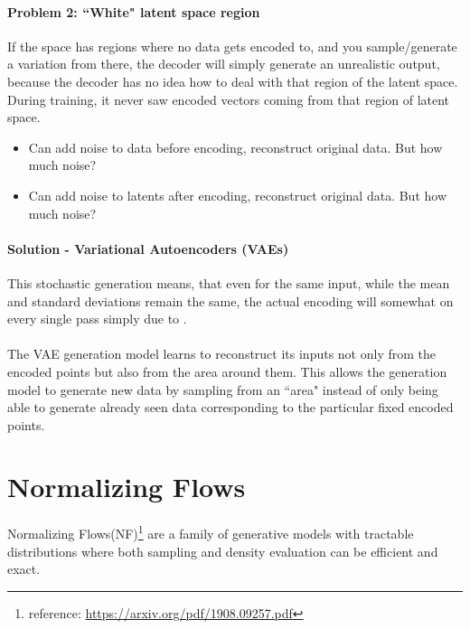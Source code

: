 \documentclass[11pt]{article}
\begin{document}
\paragraph{Problem 2: ``White" latent space region}
If the space has regions where no data gets encoded to, and you sample/generate a variation from there, the decoder will simply generate an unrealistic output, because the decoder has no idea how to deal with that region of the latent space. During training, it never saw encoded vectors coming from that region of latent space.\\
\begin{itemize}
	\item Can add noise to data before encoding, reconstruct original data. But how much noise? 
	\item Can add noise to latents after encoding, reconstruct original data. But how much noise?
\end{itemize}

\paragraph{Solution - Variational Autoencoders (VAEs)}
This stochastic generation means, that even for the same input, while the mean and standard deviations remain the same, the actual encoding will somewhat  on every single pass simply due to . \\
\\
The VAE generation model learns to reconstruct its inputs not only from the encoded points but also from the area around them. This allows the generation model to generate new data by sampling from an ``area" instead of only being able to generate already seen data corresponding to the particular fixed encoded points.

\section{Normalizing Flows}
Normalizing Flows(NF)\footnote{reference: \url{https://arxiv.org/pdf/1908.09257.pdf}} are a family of generative models with tractable distributions where both sampling and density evaluation can be efficient and exact.
\end{document}

